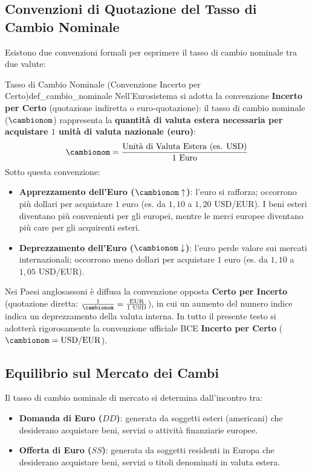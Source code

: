 \subsection{Convenzioni di Quotazione del Tasso di Cambio Nominale}
Esistono due convenzioni formali per esprimere il tasso di cambio nominale tra due valute:

\begin{definizione}{Tasso di Cambio Nominale (Convenzione Incerto per Certo)}{def_cambio_nominale}
Nell'Eurosistema si adotta la convenzione \textbf{Incerto per Certo} (quotazione indiretta o euro-quotazione): il tasso di cambio nominale ($\cambionom$) rappresenta la \textbf{quantità di valuta estera necessaria per acquistare $1$ unità di valuta nazionale (euro)}:
\begin{equation}
    \cambionom = \frac{\text{Unità di Valuta Estera (es. USD)}}{\text{1 Euro}}
\end{equation}
Sotto questa convenzione:
\begin{itemize}
    \item \textbf{Apprezzamento dell'Euro ($\cambionom \uparrow$)}: l'euro si rafforza; occorrono più dollari per acquistare $1$ euro (es. da $1{,}10$ a $1{,}20$ USD/EUR). I beni esteri diventano più convenienti per gli europei, mentre le merci europee diventano più care per gli acquirenti esteri.
    \item \textbf{Deprezzamento dell'Euro ($\cambionom \downarrow$)}: l'euro perde valore sui mercati internazionali; occorrono meno dollari per acquistare $1$ euro (es. da $1{,}10$ a $1{,}05$ USD/EUR).
\end{itemize}
\end{definizione}

\begin{osservazione}
Nei Paesi anglosassoni è diffusa la convenzione opposta \textbf{Certo per Incerto} (quotazione diretta: $\frac{1}{\cambionom} = \frac{\text{EUR}}{\text{1 USD}}$), in cui un aumento del numero indice indica un deprezzamento della valuta interna. In tutto il presente testo si adotterà rigorosamente la convenzione ufficiale BCE \textbf{Incerto per Certo} ($\cambionom = \text{USD/EUR}$).
\end{osservazione}

\subsection{Equilibrio sul Mercato dei Cambi}
Il tasso di cambio nominale di mercato si determina dall'incontro tra:
\begin{itemize}
    \item \textbf{Domanda di Euro ($DD$)}: generata da soggetti esteri (americani) che desiderano acquistare beni, servizi o attività finanziarie europee.
    \item \textbf{Offerta di Euro ($SS$)}: generata da soggetti residenti in Europa che desiderano acquistare beni, servizi o titoli denominati in valuta estera.
\end{itemize}

